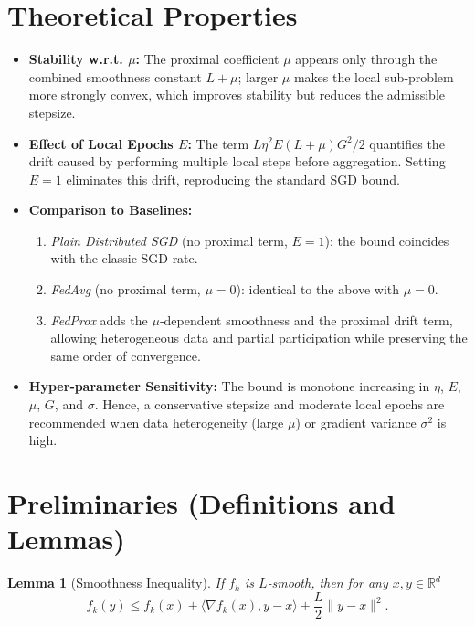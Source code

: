 \documentclass[11pt]{article}
\newtheorem{lemma}{Lemma}
\newcommand{\R}{\mathbb{R}}
\begin{document}
\section*{Theoretical Properties}
\begin{itemize}
    \item \textbf{Stability w.r.t. $\mu$:} The proximal coefficient $\mu$ appears only
          through the combined smoothness constant $L+\mu$; larger $\mu$ makes the
          local sub‑problem more strongly convex, which improves stability but reduces
          the admissible stepsize.
    \item \textbf{Effect of Local Epochs $E$:} The term $L\eta^{2}E(L+\mu)G^{2}/2$
          quantifies the drift caused by performing multiple local steps before
          aggregation. Setting $E=1$ eliminates this drift, reproducing the standard
          SGD bound.
    \item \textbf{Comparison to Baselines:}
          \begin{enumerate}
              \item \emph{Plain Distributed SGD} (no proximal term, $E=1$): the bound
                    coincides with the classic SGD rate.
              \item \emph{FedAvg} (no proximal term, $\mu=0$): identical to the above
                    with $\mu=0$.
              \item \emph{FedProx} adds the $\mu$‑dependent smoothness and the
                    proximal drift term, allowing heterogeneous data and partial
                    participation while preserving the same order of convergence.
          \end{enumerate}
    \item \textbf{Hyper‑parameter Sensitivity:}
          The bound is monotone increasing in $\eta$, $E$, $\mu$, $G$, and $\sigma$.
          Hence, a conservative stepsize and moderate local epochs are recommended
          when data heterogeneity (large $\mu$) or gradient variance $\sigma^{2}$
          is high.
\end{itemize}

\section*{Preliminaries (Definitions and Lemmas)}
\begin{lemma}[Smoothness Inequality]
\label{lem:smooth}
If $f_k$ is $L$‑smooth, then for any $x,y\in\R^{d}$
\[
f_k(y)\le f_k(x)+\langle\nabla f_k(x),y-x\rangle+\frac{L}{2}\|y-x\|^{2}.
\]
\end{lemma}
\end{document}
